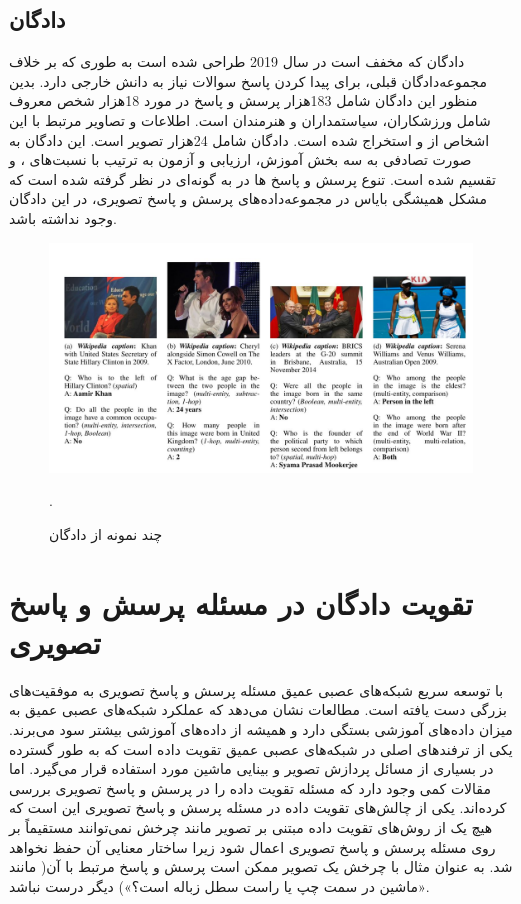 \subsection{ دادگان }
	 دادگان 
	\cite{shah2019kvqa}
	 که مخفف
	است در سال 2019 طراحی شده است به طوری که بر خلاف مجموعه‌دادگان قبلی، برای پیدا کردن پاسخ سوالات نیاز به دانش خارجی دارد. بدین منظور این دادگان شامل 183هزار پرسش و پاسخ در مورد 18هزار شخص معروف شامل ورزشکاران، سیاستمداران و هنرمندان است.  اطلاعات و تصاویر مرتبط با این  اشخاص از
	و
	استخراج شده است. دادگان
شامل 24هزار تصویر است. این ‌دادگان به صورت تصادفی به سه بخش آموزش، ارزیابی و آزمون به ترتیب با نسبت‌های
 	، 
  و
   تقسیم شده است. تنوع پرسش و پاسخ ها در 
	به گونه‌ای در نظر گرفته شده است که مشکل همیشگی بایاس در مجموعه‌داده‌های پرسش و پاسخ تصویری، در این دادگان وجود نداشته باشد.
   \begin{figure}
		\centerline{\includegraphics[scale=0.4]{images/KVQA.JPG}}
		\caption[چند نمونه از ‌دادگان]{چند نمونه از ‌دادگان \cite{shah2019kvqa}}.
		\label{fig:KVQAExample}
    \end{figure}

\section{تقویت ‌دادگان در مسئله پرسش و پاسخ تصویری}
با توسعه سریع شبکه‌های عصبی عمیق مسئله پرسش و پاسخ تصویری به موفقیت‌های بزرگی دست یافته است. مطالعات نشان می‌دهد که عملکرد شبکه‌های عصبی عمیق به میزان داده‌های آموزشی بستگی دارد و همیشه از داده‌های آموزشی بیشتر سود می‌برند. یکی از ترفندهای اصلی در شبکه‌های عصبی عمیق تقویت داده
 است که به طور گسترده در بسیاری از مسائل پردازش تصویر و بینایی ماشین مورد استفاده قرار می‌گیرد. اما مقالات کمی وجود دارد که مسئله تقویت داده را در پرسش و پاسخ تصویری بررسی کرده‌اند. یکی از چالش‌های تقویت داده در مسئله پرسش و پاسخ تصویری این است که هیچ یک از روش‌های تقویت داده مبتنی بر تصویر مانند چرخش
  نمی‌توانند مستقیماً بر روی مسئله پرسش و پاسخ تصویری اعمال شود زیرا ساختار معنایی آن حفظ نخواهد شد. به عنوان مثال با چرخش یک تصویر ممکن است پرسش و پاسخ مرتبط با آن( مانند «ماشین در سمت چپ یا راست سطل زباله است؟») دیگر درست نباشد.
  
